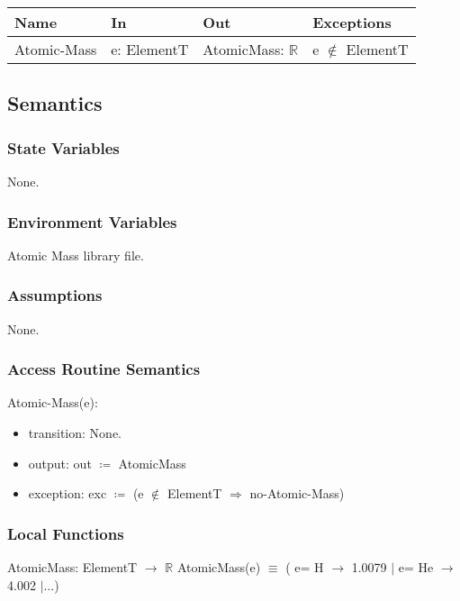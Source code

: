 \documentclass[12pt, titlepage]{article}
\begin{document}
\begin{center}
\begin{tabular}{p{2cm} p{4cm} p{4cm} p{2cm}}
\hline
\textbf{Name} & \textbf{In} & \textbf{Out} & \textbf{Exceptions} \\
\hline
{Atomic-Mass} & e: ElementT & AtomicMass: $\mathbb{R}$ & e $\notin$ ElementT  \\
\hline
\end{tabular}
\end{center}

\subsection{Semantics}

\subsubsection{State Variables}

None.

\subsubsection{Environment Variables}

Atomic Mass library file.

\subsubsection{Assumptions}

None.

\subsubsection{Access Routine Semantics}

\noindent Atomic-Mass(e):
\begin{itemize}
\item transition: None.
\item output:  out $\coloneqq$ AtomicMass 
\item exception: exc $\coloneqq$ (e $\notin$ ElementT $\Rightarrow$  no-Atomic-Mass)
\end{itemize}

\subsubsection{Local Functions}
AtomicMass: ElementT $\rightarrow$ $\mathbb{R}$ 
\newline
AtomicMass(e) $\equiv$ ( e= H $\rightarrow$ 1.0079 $\vert$  e= He $\rightarrow$ 4.002 $\vert$...)  
\end{document}

